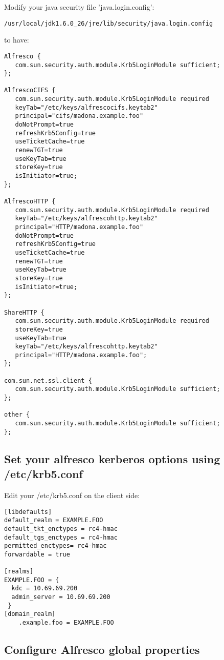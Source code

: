 \documentclass[12pt,a4]{article}
\begin{document}
Modify your java security file 'java.login.config':
\begin{verbatim}
/usr/local/jdk1.6.0_26/jre/lib/security/java.login.config
\end{verbatim}
to have:
\begin{verbatim}
Alfresco {
   com.sun.security.auth.module.Krb5LoginModule sufficient;
};

AlfrescoCIFS {
   com.sun.security.auth.module.Krb5LoginModule required
   keyTab="/etc/keys/alfrescocifs.keytab2"
   principal="cifs/madona.example.foo"
   doNotPrompt=true
   refreshKrb5Config=true
   useTicketCache=true
   renewTGT=true
   useKeyTab=true
   storeKey=true
   isInitiator=true;
};

AlfrescoHTTP {
   com.sun.security.auth.module.Krb5LoginModule required
   keyTab="/etc/keys/alfrescohttp.keytab2"
   principal="HTTP/madona.example.foo"
   doNotPrompt=true
   refreshKrb5Config=true
   useTicketCache=true
   renewTGT=true
   useKeyTab=true
   storeKey=true
   isInitiator=true;
};

ShareHTTP {
   com.sun.security.auth.module.Krb5LoginModule required
   storeKey=true
   useKeyTab=true
   keyTab="/etc/keys/alfrescohttp.keytab2"
   principal="HTTP/madona.example.foo";
};

com.sun.net.ssl.client {
   com.sun.security.auth.module.Krb5LoginModule sufficient;
};

other {
   com.sun.security.auth.module.Krb5LoginModule sufficient;
};
\end{verbatim}

\subsection{Set your alfresco kerberos options using /etc/krb5.conf}

Edit your /etc/krb5.conf on the client side:

\begin{verbatim}
[libdefaults]
default_realm = EXAMPLE.FOO
default_tkt_enctypes = rc4-hmac
default_tgs_enctypes = rc4-hmac
permitted_enctypes= rc4-hmac
forwardable = true

[realms]
EXAMPLE.FOO = {
  kdc = 10.69.69.200
  admin_server = 10.69.69.200
 }
[domain_realm]
	.example.foo = EXAMPLE.FOO
\end{verbatim}


\subsection{Configure Alfresco global properties}
\end{document}
